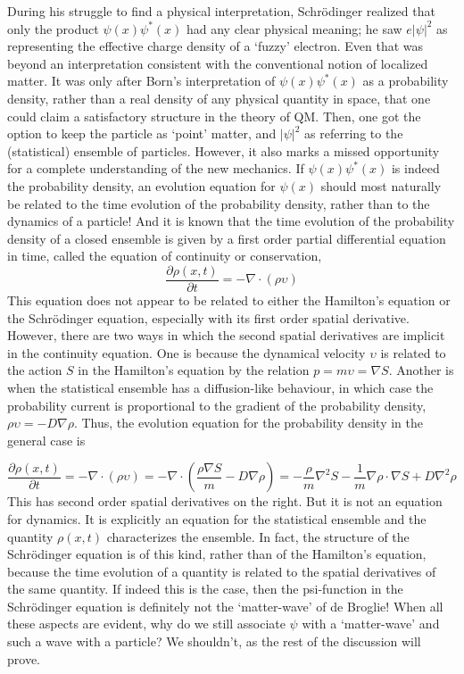 During his struggle to find a physical interpretation, Schr\"{o}dinger realized that only the
product $\psi(x) \psi^{\ast}(x)$ had any clear physical meaning; he saw $e|\psi|^2$ as representing the effective
charge density of a `fuzzy' electron. Even that was beyond an interpretation consistent
with the conventional notion of localized matter. It was only after Born's interpretation of
$\psi(x)\psi^{\ast} (x)$ as a probability density, rather than a real density of any physical quantity in
space, that one could claim a satisfactory structure in the theory of QM. Then, one got the
option to keep the particle as `point' matter, and $|\psi|^2$ as referring to the (statistical) ensemble
of particles. However, it also marks a missed opportunity for a complete understanding of
the new mechanics. If $\psi(x) \psi^{\ast} (x)$ is indeed the probability density, an evolution equation
for $\psi(x)$ should most naturally be related to the time evolution of the probability density,
rather than to the dynamics of a particle! And it is known that the time evolution of the
probability density of a closed ensemble is given by a first order partial differential equation
in time, called the equation of continuity or conservation,
\begin{equation*}
\frac{\partial \rho (x,t)}{\partial t} = - \nabla \cdot (\rho \upsilon) \tag{8}\label{c14-eq8}
\end{equation*}
This equation does not appear to be related to either the Hamilton's equation or the
Schr\"{o}dinger equation, especially with its first order spatial derivative. However, there are
two ways in which the second spatial derivatives are implicit in the continuity equation. One
is because the dynamical velocity $\upsilon$ is related to the action $S$ in the Hamilton's equation
by the relation $p = m \upsilon =\nabla S$. Another is when the statistical ensemble has a 
diffusion-like behaviour, in which case the probability current is proportional to the gradient of the
probability density, $\rho \upsilon = - D \nabla \rho$.
Thus, the evolution equation for the probability density in the general case is

{\fontsize{9}{9}\selectfont\begin{equation*}
\frac{\partial \rho (x,t)}{\partial t} = - \nabla \cdot (\rho \upsilon) = - \nabla \cdot \left(\frac{\rho \nabla S}{m} - D \nabla \rho \right) = - \frac{\rho}{m} \nabla^2 S - \frac{1}{m} \nabla \rho \cdot \nabla S + D \nabla^2 \rho \tag{9}\label{c14-eq9} 
\end{equation*}}
This has second order spatial derivatives on the right. But it is not an equation for dynamics. It
is explicitly an equation for the statistical ensemble and the quantity $\rho (x, t)$ characterizes
the ensemble. In fact, the structure of the Schr\"{o}dinger equation is of this kind, rather than
of the Hamilton's equation, because the time evolution of a quantity is related to the spatial
derivatives of the same quantity. If indeed this is the case, then the psi-function in the
Schr\"{o}dinger equation is definitely not the `matter-wave' of de Broglie! When all these
aspects are evident, why do we still associate $\psi$ with a `matter-wave' and such a wave with a
particle? We shouldn't, as the rest of the discussion will prove.

